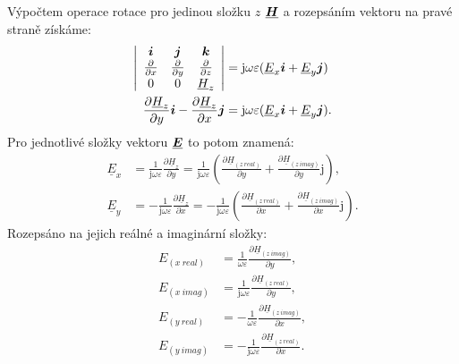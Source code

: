\documentclass[12pt,a4paper,oneside]{article}
\numberwithin{equation}{section} %
\numberwithin{figure}{section} %
\numberwithin{table}{section} %
\newcommand{\mj}{\mathrm{j}} %
\renewcommand{\vec}[1]{\mbox{\boldmath$#1$}} %
\newcommand{\faz}[1]{{\underline{#1}}} %
\begin{document}
Výpočtem operace rotace pro jedinou složku $z$ $\faz{\vec{H}}$ a rozepsáním vektoru na pravé straně získáme:
\begin{subequations}
\begin{align}
\left| 
\begin{array}{c c c}
\vec{i} & \vec{j} & \vec{k} \\ 
\frac{\partial}{\partial x} & \frac{\partial}{\partial y} & \frac{\partial}{\partial z} \\
0 & 0 & \faz{H} _z
\end{array}
\right|
&= \mj \omega \varepsilon (\faz{E} _x \vec{i} + \faz{E} _y \vec{j})
\\
\frac{\partial \faz{H} _z}{\partial y} \vec{i} - \frac{\partial \faz{H} _z}{\partial x} \vec{j} &= \mj \omega \varepsilon (\faz{E} _x \vec{i} + \faz{E} _y \vec{j}) .
\end{align}
\end{subequations}
Pro jednotlivé složky vektoru $\faz{\vec{E}}$ to potom znamená:
\begin{subequations}
\begin{align}
\faz{E} _x &= \frac{1}{\mj \omega \varepsilon} \frac{\partial \faz{H} _z}{\partial y} = \frac{1}{\mj \omega \varepsilon} (\frac{\partial \faz{H} _{(z ~ real)}}{\partial y} + \frac{\partial \faz{H} _{(z ~ imag)}}{\partial y} \mj ) ,
\\
\faz{E} _y &= - \frac{1}{\mj \omega \varepsilon} \frac{\partial \faz{H} _z}{\partial x} = - \frac{1}{\mj \omega \varepsilon} (\frac{\partial \faz{H} _{(z ~ real)}}{\partial x} + \frac{\partial \faz{H} _{(z ~ imag)}}{\partial x} \mj ) .
\end{align}
\end{subequations}
Rozepsáno na jejich reálné a imaginární složky:
\begin{subequations}
\begin{align}
E _{(x~real)} &= \frac{1}{\omega \varepsilon} \frac{\partial \faz{H} _{(z~imag)}}{\partial y} ,
\\
E _{(x~imag)} &= \frac{1}{\mj \omega \varepsilon} \frac{\partial \faz{H} _{(z~real)}}{\partial y} ,
\\
E _{(y~real)} &= - \frac{1}{\omega \varepsilon} \frac{\partial \faz{H} _{(z~imag)}}{\partial x} ,
\\
E _{(y~imag)} &= - \frac{1}{\mj \omega \varepsilon} \frac{\partial \faz{H} _{(z~real)}}{\partial x} .
\end{align}
\end{subequations}
\end{document}
